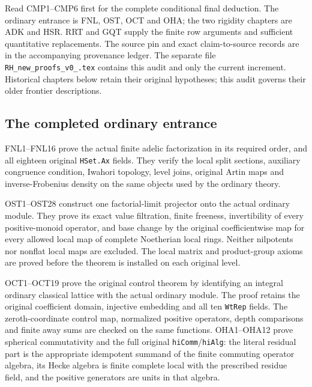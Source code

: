 \documentclass[11pt,a4paper]{article}
\numberwithin{equation}{section}
\theoremstyle{remark}\newtheorem{remark}[theorem]{Remark}
\begin{document}
Read CMP1--CMP6 first for the complete conditional final deduction.
The ordinary entrance is FNL, OST, OCT and OHA; the two rigidity chapters
are ADK and HSR. RRT and GQT supply the finite row arguments and sufficient
quantitative replacements. The source pin and exact claim-to-source
records are in the accompanying provenance ledger. The separate file
\texttt{RH\_\allowbreak new\_\allowbreak proofs\_\allowbreak v0\_.\allowbreak tex} contains this audit and only the
current increment. Historical chapters below retain their original
hypotheses; this audit governs their older frontier descriptions.

\subsection{The completed ordinary entrance}

FNL1--FNL16 prove the actual finite adelic factorization in its required
order, and all eighteen original \texttt{HSet.\allowbreak Ax} fields. They verify the
local split sections, auxiliary congruence condition, Iwahori topology,
level joins, original Artin maps and inverse-Frobenius density on the
same objects used by the ordinary theory.

OST1--OST28 construct one factorial-limit projector onto the actual
ordinary module. They prove its exact value filtration, finite freeness,
invertibility of every positive-monoid operator, and base change by the
original coefficientwise map for every allowed local map of complete
Noetherian local rings. Neither nilpotents nor nonflat local maps are
excluded. The local matrix and product-group axioms are proved before
the theorem is installed on each original level.

OCT1--OCT19 prove the original control theorem by identifying an integral
ordinary classical lattice with the actual ordinary module. The proof
retains the original coefficient domain, injective embedding and all ten
\texttt{Wt\allowbreak Rep} fields. The zeroth-coordinate control map, normalized
positive operators, depth comparisons and finite away sums are checked
on the same functions. OHA1--OHA12 prove spherical commutativity and the
full original \texttt{hi\allowbreak Comm}/\texttt{hi\allowbreak Alg}: the literal residual part
is the appropriate idempotent summand of the finite commuting operator
algebra, its Hecke algebra is finite complete local with the prescribed
residue field, and the positive generators are units in that algebra.
\end{document}
